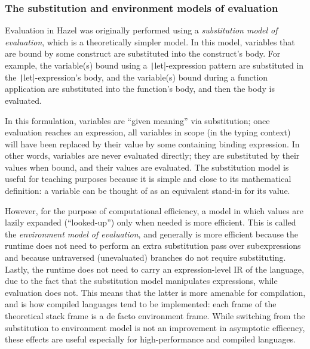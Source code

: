 \subsubsection{The substitution and environment models of evaluation}
\label{sec:sub-vs-eval}


Evaluation in Hazel was originally performed using a \textit{substitution model of evaluation}, which is a theoretically simpler model. In this model, variables that are bound by some construct are substituted into the construct's body. For example, the variable(s) bound using a \texttt|let|-expression pattern are substituted in the \texttt|let|-expression's body, and the variable(s) bound during a function application are substituted into the function's body, and then the body is evaluated.


In this formulation, variables are ``given meaning'' via substitution; once evaluation reaches an expression, all variables in scope (in the typing context) will have been replaced by their value by some containing binding expression. In other words, variables are never evaluated directly; they are substituted by their values when bound, and their values are evaluated. The substitution model is useful for teaching purposes because it is simple and close to its mathematical definition: a variable can be thought of as an equivalent stand-in for its value.

However, for the purpose of computational efficiency, a model in which values are lazily expanded (``looked-up'') only when needed is more efficient. This is called the \textit{environment model of evaluation}, and generally is more efficient because the runtime does not need to perform an extra substitution pass over subexpressions and because untraversed (unevaluated) branches do not require substituting. Lastly, the runtime does not need to carry an expression-level IR of the language, due to the fact that the substitution model manipulates expressions, while evaluation does not. This means that the latter is more amenable for compilation, and is how compiled languages tend to be implemented: each frame of the theoretical stack frame is a de facto environment frame. While switching from the substitution to environment model is not an improvement in asymptotic efficency, these effects are useful especially for high-performance and compiled languages.

